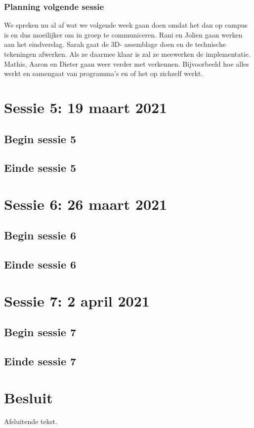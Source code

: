 \documentclass[a4paper,twoside,kulak]{kulakreport} %
\begin{document}
\subsection{Planning volgende sessie}
We spreken nu al af wat we volgende week gaan doen omdat het dan op campus is en dus moeilijker om in groep te communiceren. Rani en Jolien gaan werken aan het eindverslag. Sarah gaat de 3D- assemblage doen en de technische tekeningen afwerken. Als ze daarmee klaar is zal ze meewerken de implementatie. Mathis, Aaron en Dieter gaan weer verder met verkennen. Bijvoorbeeld hoe alles werkt en samengaat van programma's en of het op zichzelf werkt. %


\chapter{Sessie 5: 19 maart 2021}
\section{Begin sessie 5}

\section{Einde sessie 5}


\chapter{Sessie 6: 26 maart 2021}
\section{Begin sessie 6}

\section{Einde sessie 6}


\chapter{Sessie 7: 2 april 2021}
\section{Begin sessie 7}

\section{Einde sessie 7}












\chapter*{Besluit}
Afsluitende tekst.
\end{document}
